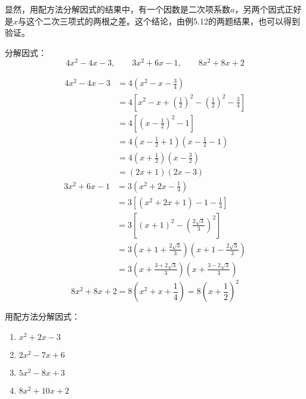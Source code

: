 显然，用配方法分解因式的结果中，有一个因数是二次项系数$a$，另两个因式正好是$x$与这个二次三项式的两根之差。这个结论，由例5.12的两题结果，也可以得到验证。

\begin{example}
  分解因式： 
\[4x^2-4x-3,\qquad 3x^2+6x-1,\qquad 8x^2+8x+2 \] 
\end{example}



\begin{solution}
 \[\begin{split}
    4x^2-4x-3&=4\left(x^2-x-\frac{3}{4}\right)\\
    &=4\left[x^2-x+\left(\frac{1}{2}\right)^2-\left(\frac{1}{2}\right)^2-\frac{3}{4}\right]\\
    &=4\left[\left(x-\frac{1}{2}\right)^2-1\right]\\
    &=4\left(x-\frac{1}{2}+1\right)\left(x-\frac{1}{2}-1\right)\\
    &=4\left(x+\frac{1}{2}\right)\left(x-\frac{3}{2}\right)\\
    &=(2x+1)(2x-3)
 \end{split}\]   
 \[\begin{split}
    3x^2+6x-1&=3\left(x^2+2x-\frac{1}{3}\right)\\
    &=3\left[(x^2+2x+1)-1-\frac{1}{3}\right]\\
    &=3\left[(x+1)^2-\left(\frac{2\sqrt{3}}{3}\right)^2\right]\\
    &=3\left(x+1+\frac{2\sqrt{3}}{3}\right)\left(x+1-\frac{2\sqrt{3}}{3}\right)\\
    &=3\left(x+\frac{3+2\sqrt{3}}{3}\right)\left(x+\frac{3-2\sqrt{3}}{3}\right)
 \end{split}\]  
 \[
    8x^2+8x+2=8\left(x^2+x+\frac{1}{4}\right) =8\left(x+\frac{1}{2}\right)^2
\]  
\end{solution}

\begin{ex}
    用配方法分解因式：
\begin{multicols}{2}
    \begin{enumerate}
        \item $x^2+2x-3$
        \item $2x^2-7x+6$
        \item $5x^2-8x+3$
        \item $8x^2+10x+2$
    \end{enumerate}
\end{multicols} 
\end{ex}

